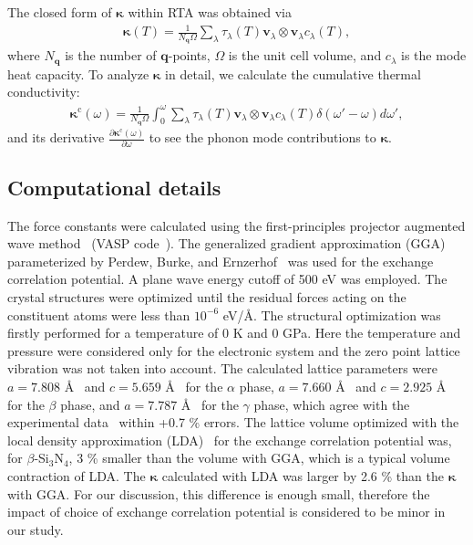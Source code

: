 \documentclass[twocolumn,amsmath,amssymb,a4paper,prb,superscriptaddress,floatfix]{revtex4-1}
\begin{document}
The closed form of $\boldsymbol{\kappa}$ within RTA was obtained via
\begin{align}
 \label{eq:kappa}
 \boldsymbol{\kappa}(T) = \frac{1}{N_\mathbf{q}\Omega} \sum_\lambda
 \tau_\lambda(T) \mathbf{v}_\lambda \otimes \mathbf{v}_\lambda c_\lambda(T),
\end{align}
where $N_\mathbf{q}$ is the number of
$\mathbf{q}$-points, $\Omega$ is the unit cell volume, and $c_\lambda$
is the mode heat capacity. To analyze $\boldsymbol{\kappa}$ in detail, we calculate
the cumulative thermal conductivity:
\begin{align}
 \label{eq:cum-kappa}
 \boldsymbol{\kappa}^\text{c}(\omega) = \frac{1}{N_\mathbf{q}\Omega}
 \int_0^\omega \sum_\lambda
 \tau_\lambda(T) \mathbf{v}_\lambda \otimes \mathbf{v}_\lambda
 c_\lambda(T) \delta(\omega'-\omega)d\omega',
\end{align}
and its derivative $\frac{\partial
\boldsymbol{\kappa}^\text{c}(\omega)}{\partial \omega}$ to see the phonon mode
contributions to $\boldsymbol{\kappa}$.

\subsection{Computational details}

The force constants were calculated using the first-principles projector
augmented wave method~\cite{paw} (VASP code~\cite{vasp-1996,vasp-1995,
vasp-1999}). The generalized gradient approximation (GGA) parameterized by
Perdew, Burke, and Ernzerhof~\cite{pbe} was used for the exchange correlation
potential. A plane wave energy cutoff of 500 eV was employed. The crystal
structures were optimized until the residual forces acting on the constituent
atoms were less than $10^{-6}$ eV/\AA. The structural optimization was firstly
performed for a temperature of 0 K and 0 GPa. Here the temperature and pressure
were considered only for the electronic system and the zero point lattice
vibration was not taken into account. The calculated lattice parameters were
$a=7.808$ \AA~ and $c=5.659$ \AA~ for the $\alpha$ phase, $a=7.660$ \AA~ and
$c=2.925$ \AA~ for the $\beta$ phase, and $a=7.787$ \AA~ for the $\gamma$ phase,
which agree with the experimental data~\cite{yashima,boulay,paszkowicz} within
+0.7 \% errors. The lattice volume optimized with the local density
approximation (LDA)~\cite{lda} for the exchange correlation potential was, for
$\beta$-Si$_3$N$_4$, 3 \% smaller than the volume with GGA, which is a typical
volume contraction of LDA. The $\boldsymbol{\kappa}$ calculated with LDA was
larger by 2.6 \% than the $\boldsymbol{\kappa}$ with GGA. For our discussion,
this difference is enough small, therefore the impact of choice of exchange
correlation potential is considered to be minor in our study.
\end{document}

